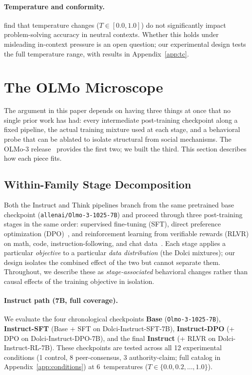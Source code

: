 \documentclass[11pt]{article}
\begin{document}
\paragraph{Temperature and conformity.}
\citet{renze2024} find that temperature changes ($T \in [0.0, 1.0]$) do not significantly impact problem-solving accuracy in neutral contexts. Whether this holds under misleading in-context pressure is an open question; our experimental design tests the full temperature range, with results in Appendix~\ref{app:tc}.


\section{The OLMo Microscope}
\label{sec:method}

The argument in this paper depends on having three things at once that no single prior work has had: every intermediate post-training checkpoint along a fixed pipeline, the actual training mixture used at each stage, and a behavioral probe that can be ablated to isolate structural from social mechanisms. The OLMo-3 release~\citep{olmo3} provides the first two; we built the third. This section describes how each piece fits.

\subsection{Within-Family Stage Decomposition}
\label{sec:study1_method}

Both the Instruct and Think pipelines branch from the same pretrained base checkpoint (\texttt{allenai/Olmo-3-1025-7B}) and proceed through three post-training stages in the same order: supervised fine-tuning (SFT), direct preference optimization (DPO)~\citep{rafailov2023dpo}, and reinforcement learning from verifiable rewards (RLVR) on math, code, instruction-following, and chat data~\citep{olmo3}. Each stage applies a particular \emph{objective} to a particular \emph{data distribution} (the Dolci mixtures); our design isolates the combined effect of the two but cannot separate them. Throughout, we describe these as \emph{stage-associated} behavioral changes rather than causal effects of the training objective in isolation.

\paragraph{Instruct path (7B, full coverage).}
We evaluate the four chronological checkpoints \textbf{Base} (\texttt{Olmo-3-1025-7B}), \textbf{Instruct-SFT} (Base + SFT on Dolci-Instruct-SFT-7B), \textbf{Instruct-DPO} (+ DPO on Dolci-Instruct-DPO-7B), and the final \textbf{Instruct} (+ RLVR on Dolci-Instruct-RL-7B). These checkpoints are tested across all 12 experimental conditions (1 control, 8 peer-consensus, 3 authority-claim; full catalog in Appendix~\ref{app:conditions}) at 6~temperatures ($T \in \{0.0, 0.2, \ldots, 1.0\}$).
\end{document}

